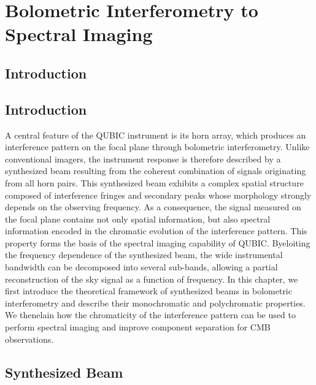 \documentclass[../../thesis.tex]{subfiles}
\begin{document}
\chapter{Bolometric Interferometry to Spectral Imaging} \label{chap:spectral_imaging}

\minitoc

\section*{Introduction}

\section*{Introduction}

A central feature of the QUBIC instrument is its horn array, which produces an interference pattern on the focal plane through bolometric interferometry. Unlike conventional imagers, the instrument response is therefore described by a synthesized beam resulting from the coherent combination of signals originating from all horn pairs.
This synthesized beam exhibits a complex spatial structure composed of interference fringes and secondary peaks whose morphology strongly depends on the observing frequency. As a consequence, the signal measured on the focal plane contains not only spatial information, but also spectral information encoded in the chromatic evolution of the interference pattern.
This property forms the basis of the spectral imaging capability of QUBIC. Byeloiting the frequency dependence of the synthesized beam, the wide instrumental bandwidth can be decomposed into several sub-bands, allowing a partial reconstruction of the sky signal as a function of frequency.
In this chapter, we first introduce the theoretical framework of synthesized beams in bolometric interferometry and describe their monochromatic and polychromatic properties. We thenelain how the chromaticity of the interference pattern can be used to perform spectral imaging and improve component separation for CMB observations.

\section{Synthesized Beam}
\end{document}
